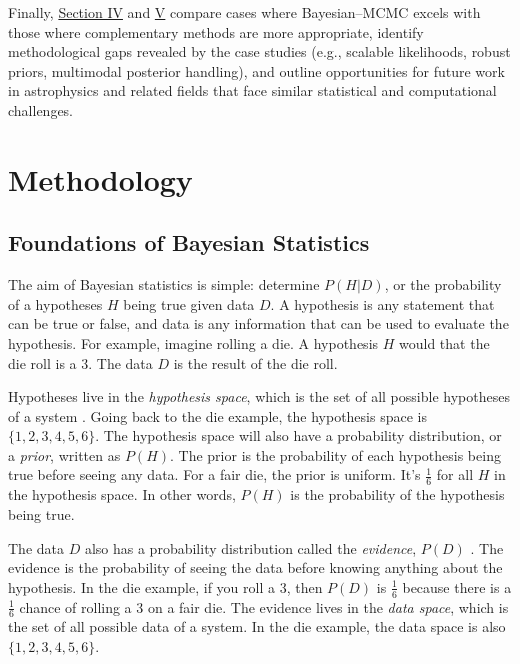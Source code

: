 \documentclass[preprint,longauthor]{aastex631}
\numberwithin{equation}{section}
\begin{document}
Finally, \hyperref[placeholder]{Section IV} and \hyperref[placeholder]{V} compare cases where Bayesian–MCMC excels with those where complementary methods are more appropriate, identify methodological gaps revealed by the case studies (e.g., scalable likelihoods, robust priors, multimodal posterior handling), and outline opportunities for future work in astrophysics and related fields that face similar statistical and computational challenges.

\section{Methodology}
\label{sec:Methodology}

\subsection{Foundations of Bayesian Statistics} %
The aim of Bayesian statistics is simple: determine $P(H|D)$, or the probability of a hypotheses $H$ being true given data $D$. A hypothesis is any statement that can be true or false, and data is any information that can be used to evaluate the hypothesis. For example, imagine rolling a die. A hypothesis $H$ would that the die roll is a 3. The data $D$ is the result of the die roll.

Hypotheses live in the \textit{hypothesis space}, which is the set of all possible hypotheses of a system \citep{brewer1BayesianInference2018}. Going back to the die example, the hypothesis space is $\{1,2,3,4,5,6\}$. The hypothesis space will also have a probability distribution, or a \textit{prior}, written as $P(H)$. The prior is the probability of each hypothesis being true before seeing any data. For a fair die, the prior is uniform. It's $\frac{1}{6}$ for all $H$ in the hypothesis space. In other words, $P(H)$ is the probability of the hypothesis being true.

The data $D$ also has a probability distribution called the \textit{evidence}, $P(D)$ \citep{brewer1BayesianInference2018}. The evidence is the probability of seeing the data before knowing anything about the hypothesis. In the die example, if you roll a 3, then $P(D)$ is $\frac{1}{6}$ because there is a $\frac{1}{6}$ chance of rolling a 3 on a fair die. The evidence lives in the \textit{data space}, which is the set of all possible data of a system. In the die example, the data space is also $\{1,2,3,4,5,6\}$.
\end{document}
